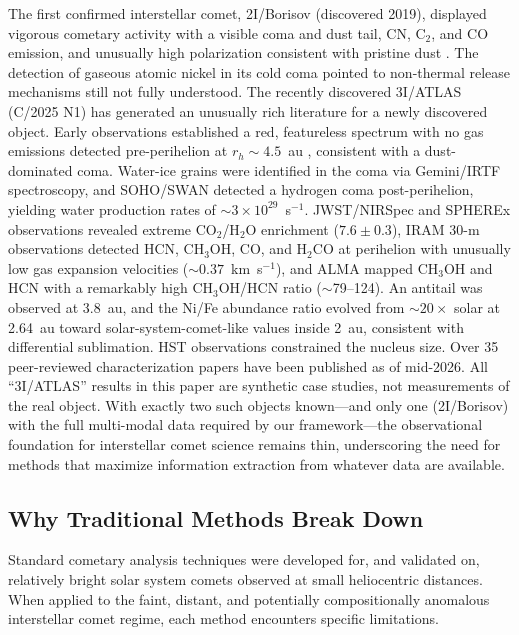 \documentclass[usenatbib]{mnras}
\begin{document}
The first confirmed interstellar comet, 2I/Borisov (discovered 2019), displayed vigorous cometary activity with a visible coma and dust tail, CN, C$_2$, and CO emission, and unusually high polarization consistent with pristine dust \citep{guzik19,jewitt19,fitzsimmons19,bodewits20,bagnulo21}. The detection of gaseous atomic nickel in its cold coma \citep{guzik21} pointed to non-thermal release mechanisms still not fully understood. The recently discovered 3I/ATLAS (C/2025 N1) has generated an unusually rich literature for a newly discovered object. Early observations established a red, featureless spectrum with no gas emissions detected pre-perihelion at $r_h \sim 4.5$~au \citep{opitom20}, consistent with a dust-dominated coma. Water-ice grains were identified in the coma via Gemini/IRTF spectroscopy, and SOHO/SWAN detected a hydrogen coma post-perihelion, yielding water production rates of $\sim 3 \times 10^{29}$~s$^{-1}$. JWST/NIRSpec and SPHEREx observations revealed extreme CO$_2$/H$_2$O enrichment ($7.6 \pm 0.3$), IRAM 30-m observations detected HCN, CH$_3$OH, CO, and H$_2$CO at perihelion with unusually low gas expansion velocities ($\sim 0.37$~km~s$^{-1}$), and ALMA mapped CH$_3$OH and HCN with a remarkably high CH$_3$OH/HCN ratio ($\sim$79--124). An antitail was observed at 3.8~au, and the Ni/Fe abundance ratio evolved from $\sim 20\times$ solar at 2.64~au toward solar-system-comet-like values inside 2~au, consistent with differential sublimation. HST observations constrained the nucleus size. Over 35 peer-reviewed characterization papers have been published as of mid-2026. All ``3I/ATLAS'' results in this paper are synthetic case studies, not measurements of the real object. With exactly two such objects known---and only one (2I/Borisov) with the full multi-modal data required by our framework---the observational foundation for interstellar comet science remains thin, underscoring the need for methods that maximize information extraction from whatever data are available.

\subsection{Why Traditional Methods Break Down}

Standard cometary analysis techniques were developed for, and validated on, relatively bright solar system comets observed at small heliocentric distances. When applied to the faint, distant, and potentially compositionally anomalous interstellar comet regime, each method encounters specific limitations.
\end{document}
